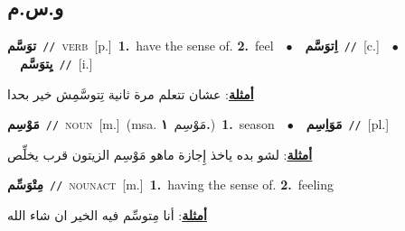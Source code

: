 \documentclass[10pt,a4paper,twoside]{article} %
\begin{document}
\begin{multicols}{2}
\vspace{-3mm}
\subsection*{\color{blue}\foreignlanguage{arabic}{و.س.م}\color{blue}{}} 

{\setlength\topsep{0pt}\textbf{\foreignlanguage{arabic}{توَسَّم}}\ {\color{gray}\texttt{//}\color{black}}\ \textsc{verb}\ [p.]\ \textbf{1.}~have the sense of.  \textbf{2.}~feel\ \ $\bullet$\ \ \setlength\topsep{0pt}\textbf{\foreignlanguage{arabic}{اِتوَسَّم}}\ {\color{gray}\texttt{//}\color{black}}\ [c.]\ \ $\bullet$\ \ \setlength\topsep{0pt}\textbf{\foreignlanguage{arabic}{يِتوَسَّم}}\ {\color{gray}\texttt{//}\color{black}}\ [i.]\  \begin{flushright}\color{gray}\foreignlanguage{arabic}{\textbf{\underline{\foreignlanguage{arabic}{أمثلة}}}: عشان تتعلم مرة ثانية تِتوسَّمِش خير بحدا}\end{flushright}\color{black}} \vspace{2mm}

{\setlength\topsep{0pt}\textbf{\foreignlanguage{arabic}{مَوْسِم}}\ {\color{gray}\texttt{//}\color{black}}\ \textsc{noun}\ [m.]\ \color{gray}(msa. \foreignlanguage{arabic}{مَوْسِم}~\foreignlanguage{arabic}{\textbf{١.}})\color{black}\ \textbf{1.}~season\ \ $\bullet$\ \ \setlength\topsep{0pt}\textbf{\foreignlanguage{arabic}{مَوَاِسِم}}\ {\color{gray}\texttt{//}\color{black}}\ [pl.]\  \begin{flushright}\color{gray}\foreignlanguage{arabic}{\textbf{\underline{\foreignlanguage{arabic}{أمثلة}}}: لشو بده ياخذ إِجازة ماهو مَوْسِم الزيتون قرب يخلِّص}\end{flushright}\color{black}} \vspace{2mm}

{\setlength\topsep{0pt}\textbf{\foreignlanguage{arabic}{مِتْوَسِّم}}\ {\color{gray}\texttt{//}\color{black}}\ \textsc{noun\textunderscore act}\ [m.]\ \textbf{1.}~having the sense of.  \textbf{2.}~feeling\  \begin{flushright}\color{gray}\foreignlanguage{arabic}{\textbf{\underline{\foreignlanguage{arabic}{أمثلة}}}: أنا مِتوسِّم فيه الخير ان شاء الله}\end{flushright}\color{black}} \vspace{2mm}


\end{multicols}
\end{document}
